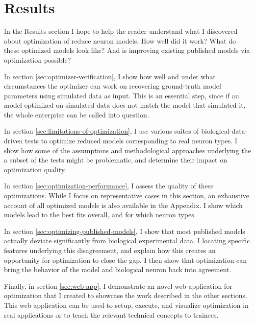 \chapter{Results}
In the Results section I hope to help the reader understand what I discovered about optimization of reduce neuron models.
How well did it work?
What do these optimized models look like?
And is improving existing published models via optimization possible?

In section \ref{sec:optimizer-verification}, I show how well and under what circumstances the optimizer can work on recovering ground-truth model parameters using simulated data as input.
This is an essential step, since if an model optimized on simulated data does not match the model that simulated it, the whole enterprise can be called into question.

In section \ref{sec:limitations-of-optimization}, I use various suites of biological-data-driven tests to optimize reduced models corresponding to real neuron types.
I show how some of the assumptions and methodological approaches underlying the a subset of the tests might be problematic, and determine their impact on optimization quality. 

In section \ref{sec:optimization-performance}, I assess the quality of these optimizations. 
While I focus on representative cases in this section, an exhaustive account of all optimized models is also available in the Appendix.
I show which models lead to the best fits overall, and for which neuron types.

In section \ref{sec:optimizing-published-models}, I show that most published models actually deviate significantly from biological experimental data.
I locating specific features underlying this disagreement, and explain how this creates an opportunity for optimization to close the gap.
I then show that optimization can bring the behavior of the model and biological neuron back into agreement.

Finally, in section \ref{sec:web-app}, I demonstrate an novel web application for optimization that I created to showcase the work described in the other sections.
This web application can be used to setup, execute, and visualize optimization in real applications or to teach the relevant technical concepts to trainees.


 


 






